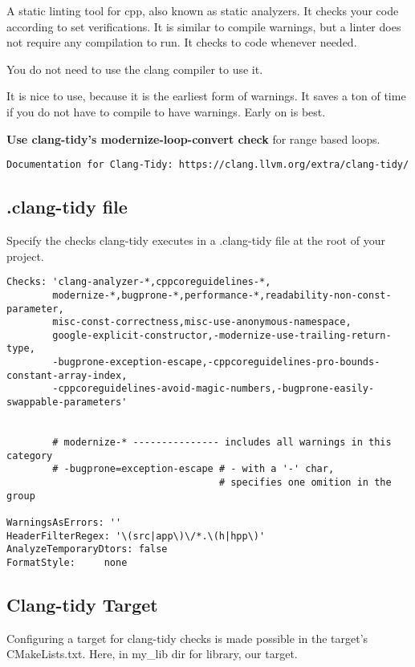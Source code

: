 \documentclass[openany]{report}
\begin{document}
A static linting tool for cpp, also known as static analyzers. It checks your code according
to set verifications. It is similar to compile warnings, but a linter does not require any compilation
to run. It checks to code whenever needed.


You do not need to use the clang compiler to use it.


It is nice to use, because it is the earliest form of warnings. It saves a ton of time if you do not have to compile
to have warnings. Early on is best.


\textbf{Use clang-tidy's modernize-loop-convert check} for range based loops.


\begin{verbatim}
Documentation for Clang-Tidy: https://clang.llvm.org/extra/clang-tidy/
\end{verbatim}


\subsection{.clang-tidy file}

Specify the checks clang-tidy executes in a .clang-tidy file at the root of your project.

\begin{verbatim}
Checks: 'clang-analyzer-*,cppcoreguidelines-*,
        modernize-*,bugprone-*,performance-*,readability-non-const-parameter,
        misc-const-correctness,misc-use-anonymous-namespace,
        google-explicit-constructor,-modernize-use-trailing-return-type,
        -bugprone-exception-escape,-cppcoreguidelines-pro-bounds-constant-array-index,
        -cppcoreguidelines-avoid-magic-numbers,-bugprone-easily-swappable-parameters'


        # modernize-* --------------- includes all warnings in this category
        # -bugprone=exception-escape # - with a '-' char, 
                                     # specifies one omition in the group

WarningsAsErrors: ''
HeaderFilterRegex: '\(src|app\)\/*.\(h|hpp\)'
AnalyzeTemporaryDtors: false
FormatStyle:     none
\end{verbatim}


\subsection{Clang-tidy Target}

Configuring a target for clang-tidy checks is made possible in the target's CMakeLists.txt. Here, in my\_lib dir
for library, our target.
\end{document}
